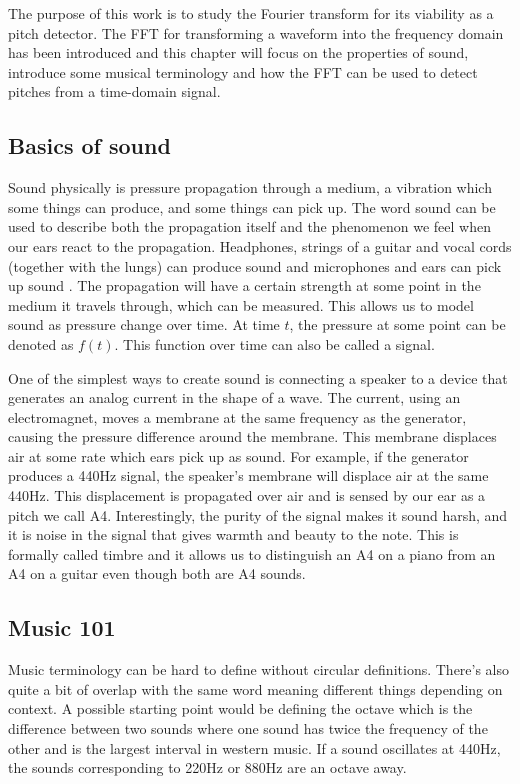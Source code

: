 The purpose of this work is to study the Fourier transform for its viability as a pitch detector. The FFT for transforming a waveform into the frequency domain has been introduced and this chapter will focus on the properties of sound, introduce some musical terminology and how the FFT can be used to detect pitches from a time-domain signal.

\subsection{Basics of sound}
Sound physically is pressure propagation through a medium, a vibration which some things can produce, and some things can pick up. The word sound can be used to describe both the propagation itself and the phenomenon we feel when our ears react to the propagation. Headphones, strings of a guitar and vocal cords (together with the lungs) can produce sound and microphones and ears can pick up sound \cite{RossingMooreWheeler}. The propagation will have a certain strength at some point in the medium it travels through, which can be measured. This allows us to model sound as pressure change over time. At time $t$, the pressure at some point can be denoted as $f(t)$. This function over time can also be called a signal.

One of the simplest ways to create sound is connecting a speaker to a device that generates an analog current in the shape of a wave. The current, using an electromagnet, moves a membrane at the same frequency as the generator, causing the pressure difference around the membrane. This membrane displaces air at some rate which ears pick up as sound. For example, if the generator produces a 440Hz signal, the speaker's membrane will displace air at the same 440Hz. This displacement is propagated over air and is sensed by our ear as a pitch we call A4. Interestingly, the purity of the signal makes it sound harsh, and it is noise in the signal that gives warmth and beauty to the note. This is formally called timbre and it allows us to distinguish an A4 on a piano from an A4 on a guitar even though both are A4 sounds.


\subsection{Music 101} 
Music terminology can be hard to define without circular definitions. There's also quite a bit of overlap with the same word meaning different things depending on context. A possible starting point would be defining the octave which is the difference between two sounds where one sound has twice the frequency of the other and is the largest interval in western music. If a sound oscillates at 440Hz, the sounds corresponding to 220Hz or 880Hz are an octave away.

